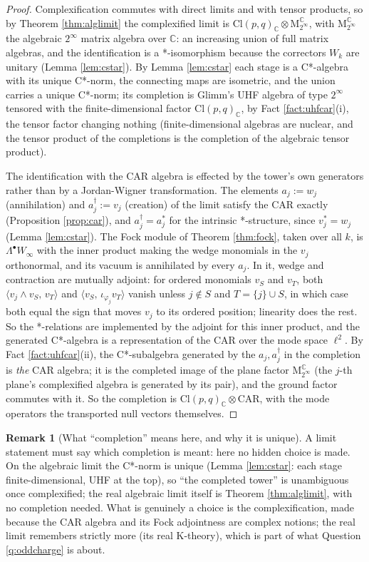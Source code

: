 \documentclass[11pt]{article}
\theoremstyle{definition}
\newtheorem{remark}[theorem]{Remark}
\newcommand{\Cl}{\mathrm{Cl}}
\newcommand{\C}{\mathbb{C}}
\newcommand{\Mat}{\mathrm{M}}
\newcommand{\CAR}{\mathrm{CAR}}
\begin{document}
\begin{proof}
Complexification commutes with direct limits and with tensor products, so by Theorem \ref{thm:alglimit} the complexified limit is $\Cl(p,q)_\C \otimes \Mat_{2^\infty}^\C$, with $\Mat_{2^\infty}^\C$ the algebraic $2^\infty$ matrix algebra over $\C$: an increasing union of full matrix algebras, and the identification is a *-isomorphism because the correctors $W_k$ are unitary (Lemma \ref{lem:cstar}). By Lemma \ref{lem:cstar} each stage is a C*-algebra with its unique C*-norm, the connecting maps are isometric, and the union carries a unique C*-norm; its completion is Glimm's UHF algebra of type $2^\infty$ tensored with the finite-dimensional factor $\Cl(p,q)_\C$, by Fact \ref{fact:uhfcar}(i), the tensor factor changing nothing (finite-dimensional algebras are nuclear, and the tensor product of the completions is the completion of the algebraic tensor product).

The identification with the CAR algebra is effected by the tower's own generators rather than by a Jordan-Wigner transformation. The elements $a_j := w_j$ (annihilation) and $a_j^\dagger := v_j$ (creation) of the limit satisfy the CAR exactly (Proposition \ref{prop:car}), and $a_j^\dagger = a_j^*$ for the intrinsic *-structure, since $v_j^* = w_j$ (Lemma \ref{lem:cstar}). The Fock module of Theorem \ref{thm:fock}, taken over all $k$, is $\Lambda^\bullet W_\infty$ with the inner product making the wedge monomials in the $v_j$ orthonormal, and its vacuum is annihilated by every $a_j$. In it, wedge and contraction are mutually adjoint: for ordered monomials $v_S$ and $v_T$, both $\langle v_j \wedge v_S,\, v_T \rangle$ and $\langle v_S,\, \iota_{\varphi_j} v_T \rangle$ vanish unless $j \notin S$ and $T = \{j\} \cup S$, in which case both equal the sign that moves $v_j$ to its ordered position; linearity does the rest. So the *-relations are implemented by the adjoint for this inner product, and the generated C*-algebra is a representation of the CAR over the mode space $\ell^2$. By Fact \ref{fact:uhfcar}(ii), the C*-subalgebra generated by the $a_j, a_j^\dagger$ in the completion is \emph{the} CAR algebra; it is the completed image of the plane factor $\Mat_{2^\infty}^\C$ (the $j$-th plane's complexified algebra is generated by its pair), and the ground factor commutes with it. So the completion is $\Cl(p,q)_\C \otimes \CAR$, with the mode operators the transported null vectors themselves.
\end{proof}

\begin{remark}[What ``completion'' means here, and why it is unique]\label{rem:whichcompletion}
A limit statement must say which completion is meant: here no hidden choice is made. On the algebraic limit the C*-norm is unique (Lemma \ref{lem:cstar}: each stage finite-dimensional, UHF at the top), so ``the completed tower'' is unambiguous once complexified; the real algebraic limit itself is Theorem \ref{thm:alglimit}, with no completion needed. What is genuinely a choice is the complexification, made because the CAR algebra and its Fock adjointness are complex notions; the real limit remembers strictly more (its real K-theory), which is part of what Question \ref{q:oddcharge} is about.
\end{remark}
\end{document}
